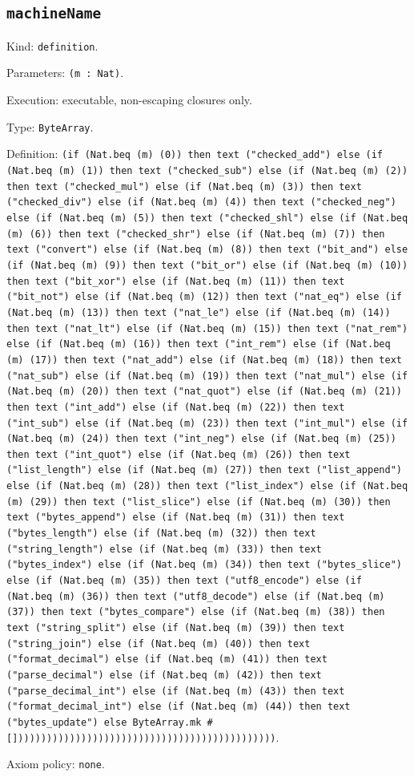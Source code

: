\documentclass[11pt]{article}
\begin{document}
\subsection*{\texttt{machineName}}
\noindent Kind: \texttt{definition}.\par
\noindent Parameters: \texttt{(m : Nat)}.\par
\noindent Execution: executable, non-escaping closures only.\par
\noindent Type: \texttt{ByteArray}.\par
\noindent Definition: \texttt{(if (Nat.beq (m) (0)) then text ("checked\_add") else (if (Nat.beq (m) (1)) then text ("checked\_sub") else (if (Nat.beq (m) (2)) then text ("checked\_mul") else (if (Nat.beq (m) (3)) then text ("checked\_div") else (if (Nat.beq (m) (4)) then text ("checked\_neg") else (if (Nat.beq (m) (5)) then text ("checked\_shl") else (if (Nat.beq (m) (6)) then text ("checked\_shr") else (if (Nat.beq (m) (7)) then text ("convert") else (if (Nat.beq (m) (8)) then text ("bit\_and") else (if (Nat.beq (m) (9)) then text ("bit\_or") else (if (Nat.beq (m) (10)) then text ("bit\_xor") else (if (Nat.beq (m) (11)) then text ("bit\_not") else (if (Nat.beq (m) (12)) then text ("nat\_eq") else (if (Nat.beq (m) (13)) then text ("nat\_le") else (if (Nat.beq (m) (14)) then text ("nat\_lt") else (if (Nat.beq (m) (15)) then text ("nat\_rem") else (if (Nat.beq (m) (16)) then text ("int\_rem") else (if (Nat.beq (m) (17)) then text ("nat\_add") else (if (Nat.beq (m) (18)) then text ("nat\_sub") else (if (Nat.beq (m) (19)) then text ("nat\_mul") else (if (Nat.beq (m) (20)) then text ("nat\_quot") else (if (Nat.beq (m) (21)) then text ("int\_add") else (if (Nat.beq (m) (22)) then text ("int\_sub") else (if (Nat.beq (m) (23)) then text ("int\_mul") else (if (Nat.beq (m) (24)) then text ("int\_neg") else (if (Nat.beq (m) (25)) then text ("int\_quot") else (if (Nat.beq (m) (26)) then text ("list\_length") else (if (Nat.beq (m) (27)) then text ("list\_append") else (if (Nat.beq (m) (28)) then text ("list\_index") else (if (Nat.beq (m) (29)) then text ("list\_slice") else (if (Nat.beq (m) (30)) then text ("bytes\_append") else (if (Nat.beq (m) (31)) then text ("bytes\_length") else (if (Nat.beq (m) (32)) then text ("string\_length") else (if (Nat.beq (m) (33)) then text ("bytes\_index") else (if (Nat.beq (m) (34)) then text ("bytes\_slice") else (if (Nat.beq (m) (35)) then text ("utf8\_encode") else (if (Nat.beq (m) (36)) then text ("utf8\_decode") else (if (Nat.beq (m) (37)) then text ("bytes\_compare") else (if (Nat.beq (m) (38)) then text ("string\_split") else (if (Nat.beq (m) (39)) then text ("string\_join") else (if (Nat.beq (m) (40)) then text ("format\_decimal") else (if (Nat.beq (m) (41)) then text ("parse\_decimal") else (if (Nat.beq (m) (42)) then text ("parse\_decimal\_int") else (if (Nat.beq (m) (43)) then text ("format\_decimal\_int") else (if (Nat.beq (m) (44)) then text ("bytes\_update") else ByteArray.mk \#[])))))))))))))))))))))))))))))))))))))))))))))}.\par
\noindent Axiom policy: \texttt{none}.\par
\end{document}
